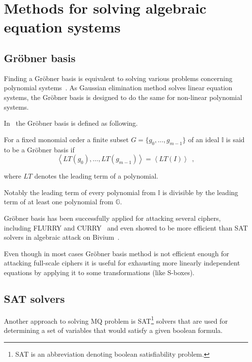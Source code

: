 \section{Methods for solving algebraic equation systems}

\subsection{Gr\"obner basis}
\label{sec:groebner}

Finding a Gr\"obner basis is equivalent to solving various problems concerning
polynomial systems~\cite{bard2009algebraic}. As Gaussian elimination method
solves linear equation systems, the Gr\"obner basis is designed to do the same
for non-linear polynomial systems.

In~\cite{Albrecht2006} the Gr\"obner basis is defined as following.

For a fixed monomial order a finite subset $G = \{g_0, \hdots, g_{m-1}\}$
of an ideal $\mathbb{I}$ is said to be a Gr\"obner basis if
\begin{equation}
    \label{eqn:groebner}
    \left< LT(g_0), \hdots, LT(g_{m-1}) \right> = \left< LT(I) \right> \enspace,
\end{equation}

where $LT$ denotes the leading term of a polynomial.

Notably the leading term of every polynomial from $\mathbb{I}$ is divisible by
the leading term of at least one polynomial from $\mathbb{G}$.

Gr\"obner basis has been successfully applied for attacking several ciphers,
including FLURRY and CURRY~\cite{Pyshkin2008:groebner} and even showed to be
more efficient than SAT solvers in algebraic attack on
Bivium~\cite{springerlink:10.1007/s11786-009-0016-7}.

Even though in most cases Gr\"obner basis method is not efficient enough for
attacking full-scale ciphers it is useful for exhausting more linearly
independent equations by applying it to some transformations (like S-boxes).

\subsection{SAT solvers}

Another approach to solving MQ problem is SAT\footnote{SAT is an abbreviation
denoting boolean satisfiability problem.} solvers that are used for
determining a set of variables that would satisfy a given boolean formula.

